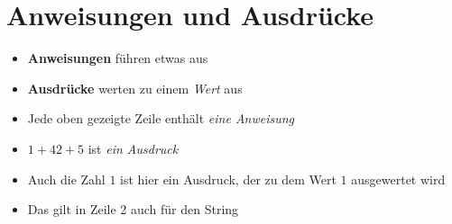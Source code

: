 




\subtitle{Kapitel 3: Daten Zwischenspeichern}
\maketitle


\section{Anweisungen und Ausdrücke}
\begin{frame}
	\slidehead
	\begin{itemize}
		\item \textbf{Anweisungen} führen etwas aus
		\item \textbf{Ausdrücke} werten zu einem \textit{Wert} aus
	\end{itemize}
	\pause
	\begin{itemize}
		\item Jede oben gezeigte Zeile enthält \textit{eine Anweisung}
		\item $1 + 42 + 5$ ist \textit{ein Ausdruck}
		\pause
		\item Auch die Zahl $1$ ist hier ein Ausdruck, der zu dem Wert $1$ ausgewertet wird
		\item Das gilt in Zeile 2 auch für den String
	\end{itemize}

\end{frame}




